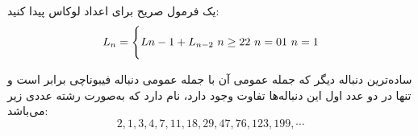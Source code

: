 	\p
	یک فرمول صریح برای اعداد لوکاس پیدا کنید:
\begin{equation}
  L_n = \Bigg\{L{n-1} + L_{n-2} \ n \geq 2 \\
  2 \ n = 0 \\ 
  1 \ n = 1
\end{equation}

\begin{definition}
	\p
{}
ساده‌ترین دنباله دیگر که جمله عمومی آن با جمله عمومی دنباله فیبوناچی برابر است و تنها در دو عدد اول این دنباله‌ها تفاوت وجود دارد،
نام دارد که به‌صورت رشته عددی زیر می‌باشد:
$$2, 1, 3, 4, 7, 11, 18, 29, 47, 76, 123, 199, \cdots$$
\end{definition}